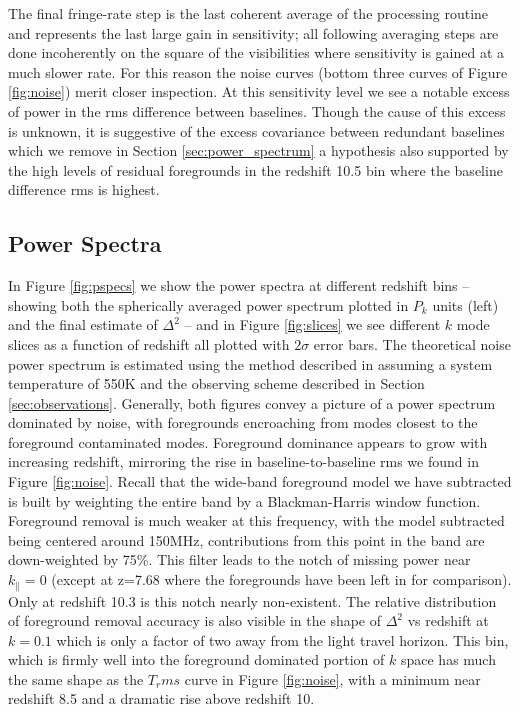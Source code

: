\documentclass[preprint]{aastex}
\begin{document}
The final fringe-rate step is the last coherent average of the processing routine and represents the last large gain in sensitivity; all following averaging steps are done incoherently on the square of the visibilities where sensitivity is gained at a much slower rate. For this reason the noise curves (bottom three curves of Figure \ref{fig:noise})  merit closer inspection.  At this sensitivity level we see a notable excess of power in the rms difference between baselines. Though the cause of this excess is unknown, it is suggestive of the excess covariance between redundant baselines which we remove in Section \ref{sec:power_spectrum} a hypothesis also supported by the high levels of residual foregrounds in the redshift 10.5 bin where the baseline difference rms is highest.




\subsection{Power Spectra}


In  Figure \ref{fig:pspecs} we show the  power spectra at different redshift bins --showing both the spherically averaged power spectrum plotted in $P_k$ units (left) and the final estimate of $\Delta^2$ -- and in Figure \ref{fig:slices} we see different $k$ mode slices as a function of redshift  all plotted with $2\sigma$ error bars.   The theoretical noise power spectrum is estimated using the method described in \cite{Pober:2014p10390} assuming a system temperature of 550K and the observing scheme described in Section \ref{sec:observations}.  Generally, both figures convey a picture of a power spectrum dominated by noise, with foregrounds encroaching from modes closest to the foreground contaminated modes.  Foreground dominance appears to grow with increasing redshift, mirroring the rise in baseline-to-baseline rms we found in Figure \ref{fig:noise}.  Recall that the wide-band foreground model we have subtracted is built by weighting the entire band by a Blackman-Harris window function.   Foreground removal is much weaker at this frequency, with the model subtracted being centered around 150MHz, contributions from this point in the band are down-weighted by 75\%.  This filter leads to the notch of missing power near $k_\parallel=0$  (except at z=7.68 where the foregrounds have been left in for comparison).  Only at redshift 10.3 is this notch nearly non-existent.  The relative distribution of foreground removal accuracy is also visible in the shape of $\Delta^2$ vs redshift at $k=0.1$ which is only a factor of two away from the light travel horizon.  This bin, which is firmly well into the foreground dominated portion of $k$ space has much the same shape as the $T_rms$ curve in Figure \ref{fig:noise}, with a minimum near redshift 8.5 and a dramatic rise above redshift 10.
\end{document}
